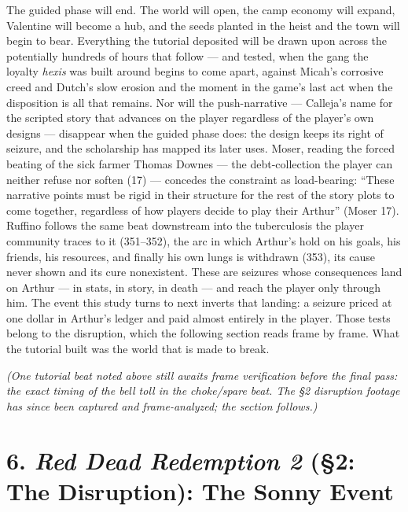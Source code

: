 The guided phase will end. The world will open, the camp economy will expand, Valentine will become a hub, and the seeds planted in the heist and the town will begin to bear. Everything the tutorial deposited will be drawn upon across the potentially hundreds of hours that follow — and tested, when the gang the loyalty \textit{hexis} was built around begins to come apart, against Micah's corrosive creed and Dutch's slow erosion and the moment in the game's last act when the disposition is all that remains. %
Nor will the push-narrative — Calleja's name for the scripted story that advances on the player regardless of the player's own designs — disappear when the guided phase does: the design keeps its right of seizure, and the scholarship has mapped its later uses. Moser, reading the forced beating of the sick farmer Thomas Downes — the debt-collection the player can neither refuse nor soften (17) — concedes the constraint as load-bearing: ``These narrative points must be rigid in their structure for the rest of the story plots to come together, regardless of how players decide to play their Arthur'' (Moser 17). Ruffino follows the same beat downstream into the tuberculosis the player community traces to it (351--352), the arc in which Arthur's hold on his goals, his friends, his resources, and finally his own lungs is withdrawn (353), its cause never shown and its cure nonexistent. These are seizures whose consequences land on Arthur — in stats, in story, in death — and reach the player only through him. The event this study turns to next inverts that landing: a seizure priced at one dollar in Arthur's ledger and paid almost entirely in the player. Those tests belong to the disruption, which the following section reads frame by frame. What the tutorial built was the world that is made to break.

\textit{(One tutorial beat noted above still awaits frame verification before the final pass: the exact timing of the bell toll in the choke/spare beat. The §2 disruption footage has since been captured and frame-analyzed; the section follows.)}

\bigskip

\section*{6. \textit{Red Dead Redemption 2} (§2: The Disruption): The Sonny Event}

